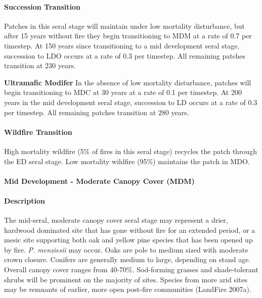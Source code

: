 \paragraph{Succession Transition} Patches in this seral stage will maintain under low mortality disturbance, but after 15 years without fire they begin transitioning to MDM at a rate of 0.7 per timestep. At 150 years since transitioning to a mid development seral stage, succession to LDO occurs at a rate of 0.3 per timestep. All remaining patches transition at 230 years. 
\begin{adjustwidth}{2cm}{}

\textbf{Ultramafic Modifer}  In the absence of low mortality disturbance, patches will begin transitioning to MDC at 30 years at a rate of 0.1 per timestep. At 200 years in the mid development seral stage, succession to LD occurs at a rate of 0.3 per timestep. All remaining patches transition at 280 years.

\end{adjustwidth}
\paragraph{Wildfire Transition}
High mortality wildfire (5\% of fires in this seral stage) recycles the patch through the ED seral stage. Low mortality wildfire (95\%) maintains the patch in MDO.
\noindent\hrulefill

\paragraph{Mid Development - Moderate Canopy Cover (MDM)}

\paragraph{Description} The mid-seral, moderate canopy cover seral stage may represent a drier, hardwood dominated site that has gone without fire for an extended period, or a mesic site supporting both oak and yellow pine species that has been opened up by fire. \emph{P. menziesii} may occur. Oaks are pole to medium sized with moderate crown closure. Conifers are generally medium to large, depending on stand age. Overall canopy cover ranges from 40-70\%. Sod-forming grasses and shade-tolerant shrubs will be prominent on the majority of sites. Species from more arid sites may be remnants of earlier, more open post-fire communities (LandFire 2007a).

